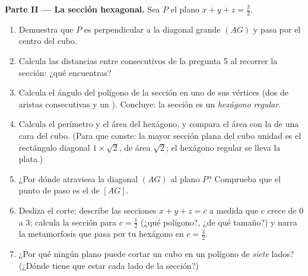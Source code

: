 \begin{problem}
\medskip
\noindent\textbf{Parte II --- La sección hexagonal.}
Sea $P$ el plano $x + y + z = \frac32$.
\begin{enumerate}[resume]
  \item Demuestra que $P$ es perpendicular a la diagonal grande $(AG)$ y
        pasa por el centro del cubo.
  \item Calcula las distancias entre  consecutivos de la
        pregunta 5 al recorrer la sección: ¿qué encuentras?
  \item Calcula el ángulo del polígono de la sección en uno de sus vértices
        (dos  de aristas consecutivas y un ).
        Concluye: la sección es un \emph{hexágono regular}.
  \item Calcula el perímetro y el área del hexágono, y compara el área con
        la de una cara del cubo. (Para que conste: la mayor sección plana
        del cubo unidad es el rectángulo diagonal $1 \times \sqrt2$, de
        área $\sqrt2$; el hexágono regular se lleva la plata.)
  \item ¿Por dónde atraviesa la diagonal $(AG)$ al plano $P$? Comprueba que
        el punto de paso es el  de $[AG]$.
  \item Desliza el corte: describe las secciones $x + y + z = c$ a medida
        que $c$ crece de $0$ a $3$; calcula la sección para
        $c = \frac12$ (¿qué polígono?, ¿de qué tamaño?) y narra la
        metamorfosis que pasa por tu hexágono en $c = \frac32$.
  \item ¿Por qué ningún plano puede cortar un cubo en un polígono de
        \emph{siete} lados? (¿Dónde tiene que estar cada lado de la
        sección?)
\end{enumerate}


\end{problem}
